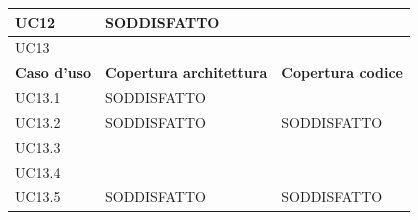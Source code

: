 \documentclass[openany,12pt,a4paper]{report}
\begin{document}
\begin{longtable}{|p{40mm}|p{40mm}|p{40mm}|}
		\hline \centering UC12 & SODDISFATTO & \\
		\hline \centering UC13 &  & \\
		\hline \centering \textbf{Caso d'uso} & \textbf{Copertura architettura} &  \textbf{Copertura codice}\\
		\hline \centering UC13.1 & SODDISFATTO & \\
		\hline \centering UC13.2 & SODDISFATTO & SODDISFATTO\\
		\hline \centering UC13.3 &  & \\
		\hline \centering UC13.4 &  & \\
		\hline \centering UC13.5 & SODDISFATTO & SODDISFATTO\\
		\hline
		
	\end{longtable}
	
\end{document}
